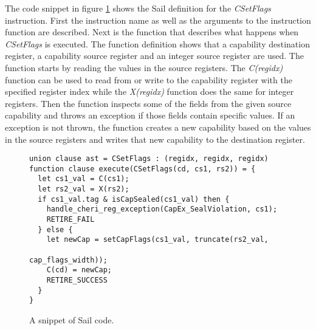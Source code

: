 The code snippet in figure \ref{fig:sailcode} shows the Sail definition for the \textit{CSetFlags} instruction.
First the instruction name as well as the arguments to the instruction function are described.
Next is the function that describes what happens when \textit{CSetFlags} is executed.
The function definition shows that a capability destination register, a capability source register and an integer source register are used.
The function starts by reading the values in the source registers.
The \textit{C(regidx)} function can be used to read from or write to the capability register with the specified register index while the \textit{X(regidx)} function does the same for integer registers.
Then the function inspects some of the fields from the given source capability and throws an exception if those fields contain specific values.
If an exception is not thrown, the function creates a new capability based on the values in the source registers and writes that new capability to the destination register.

\begin{figure}[h]
\begin{verbatim}
union clause ast = CSetFlags : (regidx, regidx, regidx)
function clause execute(CSetFlags(cd, cs1, rs2)) = {
  let cs1_val = C(cs1);
  let rs2_val = X(rs2);
  if cs1_val.tag & isCapSealed(cs1_val) then {
    handle_cheri_reg_exception(CapEx_SealViolation, cs1);
    RETIRE_FAIL
  } else {
    let newCap = setCapFlags(cs1_val, truncate(rs2_val,
                                               cap_flags_width));
    C(cd) = newCap;
    RETIRE_SUCCESS
  }
}
\end{verbatim}
\caption{A snippet of Sail code.}
\label{fig:sailcode}
\end{figure}

